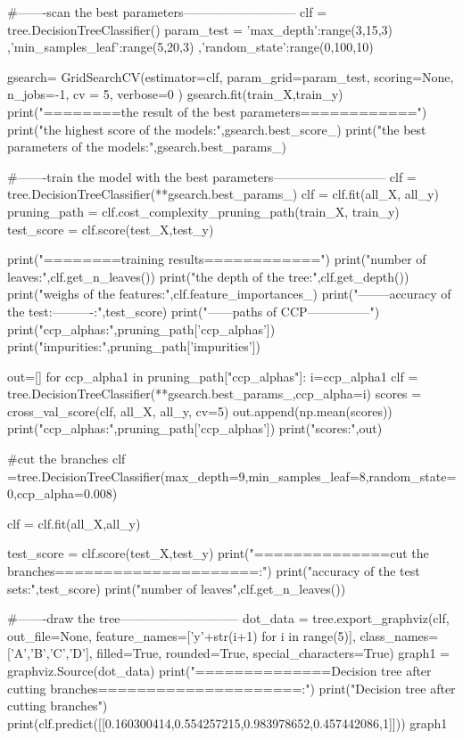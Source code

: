 \documentclass[12pt]{article}
\begin{document}
\begin{python}
    #-------scan the best parameters---------------------------
    clf = tree.DecisionTreeClassifier()
    param_test = {
                'max_depth':range(3,15,3)
                ,'min_samples_leaf':range(5,20,3)
                ,'random_state':range(0,100,10)
    }

    gsearch= GridSearchCV(estimator=clf,              
                    param_grid=param_test,     
                    scoring=None,         
                    n_jobs=-1,            
                    cv = 5,             
                    verbose=0            
                    )
    gsearch.fit(train_X,train_y)
    print("\n========the result of the best parameters============")
    print("the highest score of the models:",gsearch.best_score_)
    print("the best parameters of the models:",gsearch.best_params_)

    #-------train the model with the best parameters---------------------------
    clf = tree.DecisionTreeClassifier(**gsearch.best_params_)
    clf = clf.fit(all_X, all_y)  
    pruning_path = clf.cost_complexity_pruning_path(train_X, train_y)
    test_score = clf.score(test_X,test_y)     

    print("\n========training results============")
    print("number of leaves:",clf.get_n_leaves())
    print("the depth of the tree:",clf.get_depth())
    print("weighs of the features:",clf.feature_importances_)
    print("\n--------accuracy of the test:----------:\n",test_score)
    print("\n------paths of CCP---------------")
    print("ccp_alphas:",pruning_path['ccp_alphas'])
    print("impurities:",pruning_path['impurities'])

    out=[]
    for ccp_alpha1 in pruning_path["ccp_alphas"]:
        i=ccp_alpha1
        clf = tree.DecisionTreeClassifier(**gsearch.best_params_,ccp_alpha=i)
        scores = cross_val_score(clf, all_X, all_y, cv=5)
        out.append(np.mean(scores))
    print("ccp_alphas:",pruning_path['ccp_alphas'])
    print("scores:",out)

    #cut the branches
    clf =tree.DecisionTreeClassifier(max_depth=9,min_samples_leaf=8,random_state=0,ccp_alpha=0.008)

    clf = clf.fit(all_X,all_y)

    test_score = clf.score(test_X,test_y)
    print("\n==============cut the branches=====================:\n")
    print("accuracy of the test sets:",test_score)
    print("number of leaves",clf.get_n_leaves())

    #-------draw the tree-----------------------------
    dot_data = tree.export_graphviz(clf, out_file=None, 
                        feature_names=['y'+str(i+1) for i in range(5)],  
                        class_names=['A','B','C','D'],
                        filled=True, rounded=True,  
                        special_characters=True)  
    graph1 = graphviz.Source(dot_data)
    print("\n==============Decision tree after cutting branches=====================:\n")
    print("Decision tree after cutting branches")
    print(clf.predict([[0.160300414,0.554257215,0.983978652,0.457442086,1]]))
    graph1

\end{python}
\end{document}

